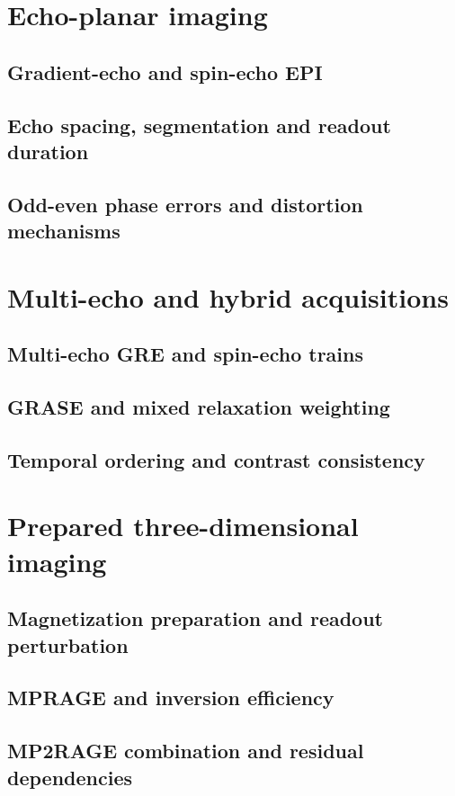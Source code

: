 \section{Echo-planar imaging}
\label{sec:08:echo-planar-imaging}
\subsection{Gradient-echo and spin-echo EPI}
\subsection{Echo spacing, segmentation and readout duration}
\subsection{Odd-even phase errors and distortion mechanisms}

\section{Multi-echo and hybrid acquisitions}
\label{sec:08:multi-echo-and-hybrid-acquisitions}
\subsection{Multi-echo GRE and spin-echo trains}
\subsection{GRASE and mixed relaxation weighting}
\subsection{Temporal ordering and contrast consistency}

\section{Prepared three-dimensional imaging}
\label{sec:08:prepared-three-dimensional-imaging}
\subsection{Magnetization preparation and readout perturbation}
\subsection{MPRAGE and inversion efficiency}
\subsection{MP2RAGE combination and residual dependencies}

